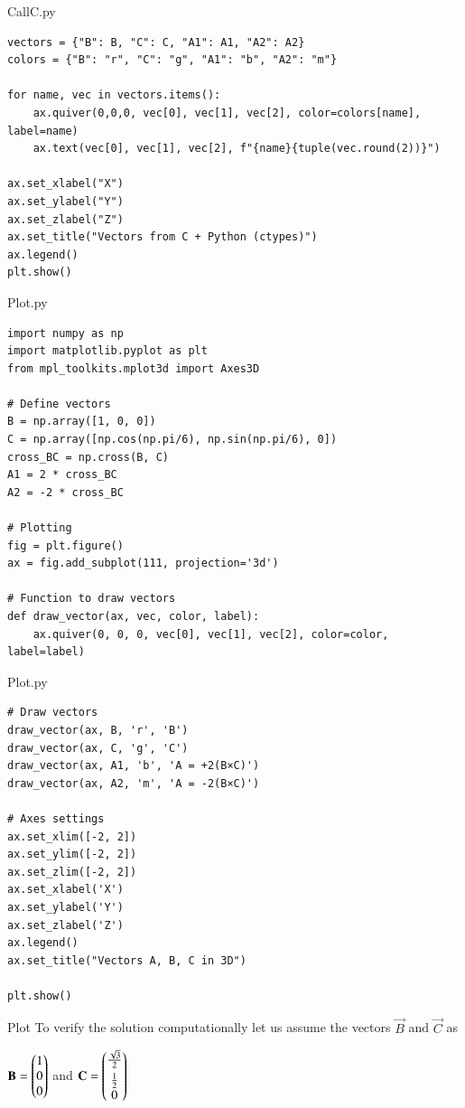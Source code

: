 \documentclass{beamer}
\begin{document}
\begin{frame}[fragile]{CallC.py}
\begin{lstlisting}
vectors = {"B": B, "C": C, "A1": A1, "A2": A2}
colors = {"B": "r", "C": "g", "A1": "b", "A2": "m"}

for name, vec in vectors.items():
    ax.quiver(0,0,0, vec[0], vec[1], vec[2], color=colors[name], label=name)
    ax.text(vec[0], vec[1], vec[2], f"{name}{tuple(vec.round(2))}")

ax.set_xlabel("X")
ax.set_ylabel("Y")
ax.set_zlabel("Z")
ax.set_title("Vectors from C + Python (ctypes)")
ax.legend()
plt.show()

\end{lstlisting}
\end{frame}

\begin{frame}[fragile]{Plot.py}
\begin{lstlisting}
import numpy as np
import matplotlib.pyplot as plt
from mpl_toolkits.mplot3d import Axes3D

# Define vectors
B = np.array([1, 0, 0])
C = np.array([np.cos(np.pi/6), np.sin(np.pi/6), 0])
cross_BC = np.cross(B, C)
A1 = 2 * cross_BC
A2 = -2 * cross_BC

# Plotting
fig = plt.figure()
ax = fig.add_subplot(111, projection='3d')

# Function to draw vectors
def draw_vector(ax, vec, color, label):
    ax.quiver(0, 0, 0, vec[0], vec[1], vec[2], color=color, label=label)
\end{lstlisting}
\end{frame}

\begin{frame}[fragile]{Plot.py}
\begin{lstlisting}
# Draw vectors
draw_vector(ax, B, 'r', 'B')
draw_vector(ax, C, 'g', 'C')
draw_vector(ax, A1, 'b', 'A = +2(B×C)')
draw_vector(ax, A2, 'm', 'A = -2(B×C)')

# Axes settings
ax.set_xlim([-2, 2])
ax.set_ylim([-2, 2])
ax.set_zlim([-2, 2])
ax.set_xlabel('X')
ax.set_ylabel('Y')
ax.set_zlabel('Z')
ax.legend()
ax.set_title("Vectors A, B, C in 3D")

plt.show()

\end{lstlisting}
\end{frame}

\begin{frame}{Plot}
  To verify the solution computationally let us assume the vectors $\vec{B}$ and $\vec{C}$ as 

\centering
$\mathbf{B}=\begin{pmatrix}1\\0\\0\end{pmatrix}$ and $\mathbf{C}=\begin{pmatrix}\frac{\sqrt{3}}{2}\\[4pt]\frac{1}{2}\\0\end{pmatrix}$  
\end{frame}
\end{document}

